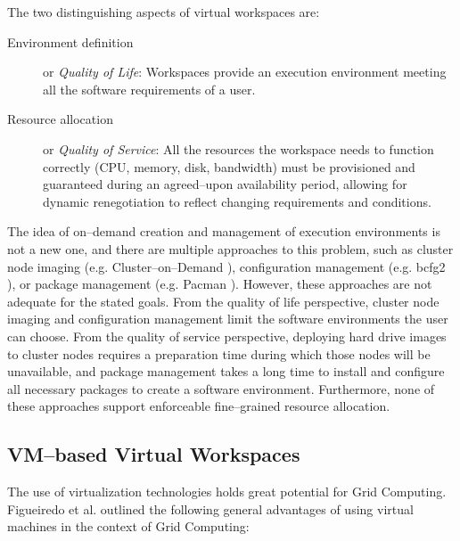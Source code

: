 The two distinguishing aspects of virtual workspaces are:

\begin{description}
\item[Environment definition] or \emph{Quality of Life}: Workspaces provide an execution environment meeting all the software requirements of a user.
\item[Resource allocation] or \emph{Quality of Service}: All the resources the workspace needs to function correctly (CPU, memory, disk, bandwidth) must be provisioned and guaranteed during an agreed--upon availability period, allowing for dynamic renegotiation to reflect changing requirements and conditions.
\end{description}

The idea of on--demand creation and management of execution environments is not a new one, and there are multiple approaches to this problem, such as cluster node imaging (e.g. Cluster--on--Demand \cite{codweb}), configuration management (e.g. bcfg2 \cite{bcfg2web}), or package management (e.g. Pacman \cite{pacmanweb}). However, these approaches are not adequate for the stated goals. From the quality of life perspective, cluster node imaging and configuration management limit the software environments the user can choose. From the quality of service perspective, deploying hard drive images to cluster nodes requires a preparation time during which those nodes will be unavailable, and package management takes a long time to install and configure all necessary packages to create a software environment. Furthermore, none of these approaches support enforceable fine--grained resource allocation.


\subsection{VM--based Virtual Workspaces}
\label{sec:vm}

The use of virtualization technologies \cite{vmbook} holds great potential for Grid Computing. Figueiredo et al.\cite{gridvm} outlined the following general advantages of using virtual machines in the context of Grid Computing:

